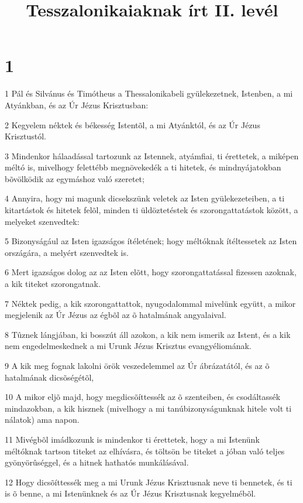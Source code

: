 

\title{Tesszalonikaiaknak írt II. levél}


\chapter{1}

\par 1 Pál és Silvánus és Timótheus a Thessalonikabeli gyülekezetnek, Istenben, a mi Atyánkban, és az Úr Jézus Krisztusban:
\par 2 Kegyelem néktek és békesség Istentõl, a mi Atyánktól, és az Úr Jézus Krisztustól.
\par 3 Mindenkor hálaadással tartozunk az Istennek, atyámfiai, ti érettetek, a miképen méltó is, mivelhogy felettébb megnövekedék a ti hitetek, és mindnyájatokban bõvölködik az egymáshoz való szeretet;
\par 4 Annyira, hogy mi magunk dicsekszünk veletek az Isten gyülekezeteiben, a ti kitartástok és hitetek felõl, minden ti üldöztetéstek és szorongattatástok között, a melyeket szenvedtek:
\par 5 Bizonyságául az Isten igazságos ítéletének; hogy méltóknak ítéltessetek az Isten országára, a melyért szenvedtek is.
\par 6 Mert igazságos dolog az az Isten elõtt, hogy szorongattatással fizessen azoknak, a kik titeket szorongatnak.
\par 7 Néktek pedig, a kik szorongattattok, nyugodalommal mivelünk együtt, a mikor megjelenik az Úr Jézus az égbõl az õ hatalmának angyalaival.
\par 8 Tûznek lángjában, ki bosszút áll azokon, a kik nem ismerik az Istent, és a kik nem engedelmeskednek a mi Urunk Jézus Krisztus evangyéliomának.
\par 9 A kik meg fognak lakolni örök veszedelemmel az Úr ábrázatától, és az õ hatalmának dicsõségétõl,
\par 10 A mikor eljõ majd, hogy megdicsõíttessék az õ szenteiben, és csodáltassék mindazokban, a kik hisznek (mivelhogy a mi tanúbizonyságunknak hitele volt ti nálatok) ama napon.
\par 11 Mivégbõl imádkozunk is mindenkor ti érettetek, hogy a mi Istenünk méltóknak tartson titeket az elhívásra, és töltsön be titeket a jóban való teljes gyönyörûséggel, és a hitnek hathatós munkálásával.
\par 12 Hogy dicsõíttessék meg a mi Urunk Jézus Krisztusnak neve ti bennetek, és ti is õ benne, a mi Istenünknek és az Úr Jézus Krisztusnak kegyelmébõl.

